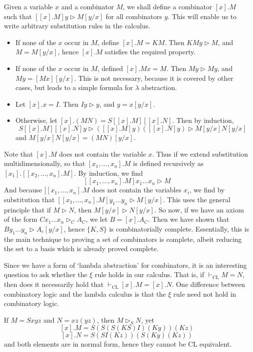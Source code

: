 Given a variable $x$ and a combinator $M$, we shall define a combinator $[x].M$ such that $[[x].M]y \rhd M[y/x]$ for all combinators $y$. This will enable us to write arbitrary substitution rules in the calculus.
%
\begin{itemize}
    \item If none of the $x$ occur in $M$, define $[x].M = KM$. Then $KMy \rhd M$, and $M = M[y/x]$, hence $[x].M$ satisfies the required property.

    \item If none of the $x$ occur in $M$, defined $[x].Mx = M$. Then $My \rhd My$, and $My = [Mx][y/x]$. This is not necessary, because it is covered by other cases, but leads to a simple formula for $\lambda$ abstraction.

    \item Let $[x].x = I$. Then $Iy \rhd y$, and $y = x[y/x]$.

    \item Otherwise, let $[x].(MN) = S[[x].M][[x].N]$. Then by induction,
    \[ S[[x].M][[x].N]y \rhd ([[x].M] y)([[x].N] y) \rhd M[y/x] N[y/x] \]
    and $M[y/x] N[y/x] = (MN)[y/x]$.
\end{itemize}
%
Note that $[x].M$ does not contain the variable $x$. Thus if we extend substitution multidimensionally, so that $[x_1, \dots, x_n].M$ is defined recursively as $[x_1].[[x_2, \dots, x_n].M]$. By induction, we find
%
\[ [[x_1, \dots, x_n].M] x_1 \dots x_n \rhd M \]
%
And because $[[x_1, \dots, x_n].M$ does not contain the variables $x_i$, we find by substitution that $[[x_1, \dots, x_n].M] y_1 \dots y_n \rhd M[y/x]$. This uses the general principle that if $M \rhd N$, then $M[y/x] \rhd N[y/x]$. So now, if we have an axiom of the form $Cx_1 \dots x_n \rhd_C A_C$, we let $B = [x].A_C$. Then we have shown that $By_1 \dots y_n \rhd A_c[y/x]$, hence $\{ K, S \}$ is combinatorially complete. Essentially, this is the main technique to proving a set of combinators is complete, albeit reducing the set to a basis which is already proved complete.

Since we have a form of `lambda abstraction' for combinators, it is an interesting question to ask whether the $\xi$ rule holds in our calculus. That is, if $\vdash_{\text{CL}} M = N$, then does it necessarily hold that $\vdash_{\text{CL}} [x].M = [x].N$. One difference between combinatory logic and the lambda calculus is that the $\xi$ rule need not hold in combinatory logic.

\begin{example}
    If $M = Sxyz$ and $N = xz(yz)$, then $M \rhd_S N$, yet
    \[ [x].M = S(S(S(KS)I)(Ky))(Kz) \]
    \[ [x].N = S(SI(Kz))(S(Ky)(Kz)) \]
    and both elements are in normal form, hence they cannot be $\text{CL}$ equivalent.
\end{example}

